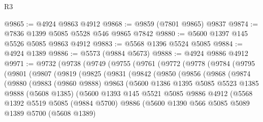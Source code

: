 \begin{lexlean}{R3}
\begin{coremodule}
@9865 := @4924 @9863 @4912
@9868 := @9859 (@7801 @9865) @9837
@9874 := @7836 @1399 @5085 @5528 @546 @9865 @7842
@9880 := @5600 @1397 @145 @5526 @5085 @9863 @4912
@9883 := @5568 @1396 @5524 @5085
@9884 := @4924 @1389
@9886 := @5573 (@9884 @5673)
@9888 := @4924 @9886 @4912
@9971 := @9732
    (@9738
      (@9749
        (@9755
          (@9761
            (@9772
              (@9778
                (@9784
                  (@9795
                    (@9801
                      (@9807
                        (@9819
                          (@9825
                            (@9831
                              (@9842
                                (@9850
                                  (@9856
                                    (@9868
                                      (@9874
                                        (@9880
                                          (@9883
                                            (@9860 @9888)
                                            @9863
                                            (@5600
                                              @1386
                                              @1395
                                              @5085
                                              @5523
                                              @1385
                                              @9888
                                              (@5608 @1385)
                                              (@5600
                                                @1393
                                                @145
                                                @5521
                                                @5085
                                                @9886
                                                @4912
                                                (@5568
                                                  @1392
                                                  @5519
                                                  @5085
                                                  (@9884 @5700)
                                                  @9886
                                                  (@5600
                                                    @1390
                                                    @566
                                                    @5085
                                                    @5089
                                                    @1389
                                                    @5700
                                                    (@5608 @1389)

\end{coremodule}
\end{lexlean}

